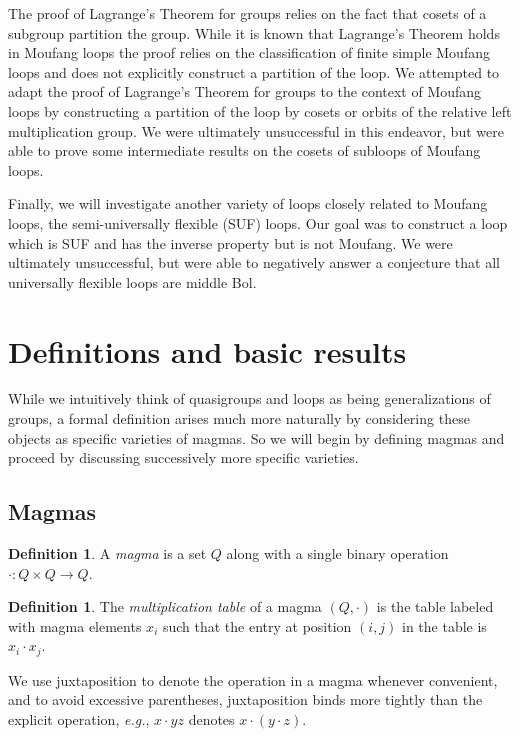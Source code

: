 \documentclass[12pt, twoside, openright]{report}
\theoremstyle{definition}
\newtheorem{dfn}[thm]{Definition}
\begin{document}
The proof of Lagrange's Theorem for groups relies on the fact that cosets of a subgroup partition the group. While it is
  known that Lagrange's Theorem holds in Moufang loops the proof relies on the classification of finite simple Moufang
  loops and does not explicitly construct a partition of the loop. We attempted to adapt the proof of Lagrange's Theorem
  for groups to the context of Moufang loops by constructing a partition of the loop by cosets or orbits of the relative
  left multiplication group. We were ultimately unsuccessful in this endeavor, but were able to prove some intermediate
  results on the cosets of subloops of Moufang loops.

Finally, we will investigate another variety of loops closely related to Moufang loops, the semi-universally flexible (SUF)
  loops. Our goal was to construct a loop which is SUF and has the inverse property but is not Moufang. We were ultimately
  unsuccessful, but were able to negatively answer a conjecture that all universally flexible loops are middle Bol.

\section{Definitions and basic results}

While we intuitively think of quasigroups and loops as being generalizations of groups, a formal definition arises much more
  naturally by considering these objects as specific varieties of magmas. So we will begin by defining magmas and proceed
  by discussing successively more specific varieties.

\subsection{Magmas}

\begin{dfn}
  A \emph{magma} is a set $Q$ along with a single binary operation $\cdot: Q\times Q\to Q$.
\end{dfn}

\begin{dfn}
  The \emph{multiplication table} of a magma $(Q, \cdot)$ is the table labeled with magma elements $x_i$ such that
    the entry at position $(i, j)$ in the table is $x_i\cdot x_j$.
\end{dfn}

We use juxtaposition to denote the operation in a magma whenever convenient, and to avoid excessive parentheses,
  juxtaposition binds more tightly than the explicit operation, \emph{e.g.}, $x\cdot yz$ denotes $x\cdot (y\cdot z)$.
\end{document}
